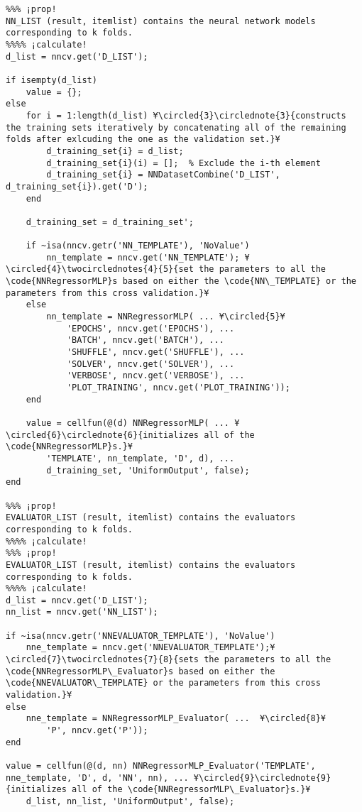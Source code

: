 \documentclass{tufte-handout}
\begin{document}
\begin{lstlisting}
%%% ¡prop!
NN_LIST (result, itemlist) contains the neural network models corresponding to k folds.
%%%% ¡calculate!
d_list = nncv.get('D_LIST');

if isempty(d_list)
    value = {};
else
    for i = 1:length(d_list) ¥\circled{3}\circlednote{3}{constructs the training sets iteratively by concatenating all of the remaining folds after exlcuding the one as the validation set.}¥
        d_training_set{i} = d_list;
        d_training_set{i}(i) = [];  % Exclude the i-th element
        d_training_set{i} = NNDatasetCombine('D_LIST', d_training_set{i}).get('D');
    end

    d_training_set = d_training_set';

    if ~isa(nncv.getr('NN_TEMPLATE'), 'NoValue')
        nn_template = nncv.get('NN_TEMPLATE'); ¥\circled{4}\twocirclednotes{4}{5}{set the parameters to all the \code{NNRegressorMLP}s based on either the \code{NN\_TEMPLATE} or the parameters from this cross validation.}¥
    else
        nn_template = NNRegressorMLP( ... ¥\circled{5}¥
            'EPOCHS', nncv.get('EPOCHS'), ...
            'BATCH', nncv.get('BATCH'), ...
            'SHUFFLE', nncv.get('SHUFFLE'), ...
            'SOLVER', nncv.get('SOLVER'), ...
            'VERBOSE', nncv.get('VERBOSE'), ...
            'PLOT_TRAINING', nncv.get('PLOT_TRAINING'));
    end
    
    value = cellfun(@(d) NNRegressorMLP( ... ¥\circled{6}\circlednote{6}{initializes all of the \code{NNRegressorMLP}s.}¥
        'TEMPLATE', nn_template, 'D', d), ...
        d_training_set, 'UniformOutput', false);
end

%%% ¡prop!
EVALUATOR_LIST (result, itemlist) contains the evaluators corresponding to k folds.
%%%% ¡calculate!
%%% ¡prop!
EVALUATOR_LIST (result, itemlist) contains the evaluators corresponding to k folds.
%%%% ¡calculate!
d_list = nncv.get('D_LIST');
nn_list = nncv.get('NN_LIST');

if ~isa(nncv.getr('NNEVALUATOR_TEMPLATE'), 'NoValue')
    nne_template = nncv.get('NNEVALUATOR_TEMPLATE');¥\circled{7}\twocirclednotes{7}{8}{sets the parameters to all the \code{NNRegressorMLP\_Evaluator}s based on either the \code{NNEVALUATOR\_TEMPLATE} or the parameters from this cross validation.}¥
else
    nne_template = NNRegressorMLP_Evaluator( ...  ¥\circled{8}¥
        'P', nncv.get('P'));
end

value = cellfun(@(d, nn) NNRegressorMLP_Evaluator('TEMPLATE', nne_template, 'D', d, 'NN', nn), ... ¥\circled{9}\circlednote{9}{initializes all of the \code{NNRegressorMLP\_Evaluator}s.}¥
    d_list, nn_list, 'UniformOutput', false);

\end{lstlisting}
\end{document}
